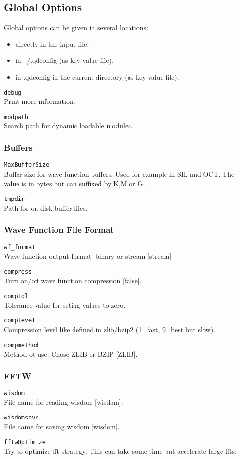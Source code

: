 \documentclass[a4paper,12pt]{scrbook}
\newcommand{\option}[2]{\item \texttt{#1}\\ #2}
\begin{document}
\subsection{Global Options}
Global options can be given in several locations:
\begin{itemize}
 \item directly in the input file.
 \item in ~/.qdconfig (as key-value file).
 \item in .qdconfig in the current directory (as key-value file).
\end{itemize}

\begin{options}
 \option{debug}{Print more information.}
 \option{modpath}{Search path for dynamic loadable modules.}
\end{options} 

\subsubsection{Buffers}
\begin{options}
 \option{MaxBufferSize}{Buffer size for wave function buffers. Used for example in SIL and OCT. The value is in bytes but
 can suffixed by K,M or G.}
 \option{tmpdir}{Path for on-disk buffer files.}
\end{options}

\subsubsection{Wave Function File Format}
\begin{options}
 \option{wf\_format}{Wave function output format: binary or stream  [stream]}
 \option{compress}{Turn on/off wave function compression [false].}
 \option{comptol}{Tolerance value for seting values to zero.}
 \option{complevel}{Compression level like defined in zlib/bzip2 (1=fast, 9=best but slow).}
 \option{compmethod}{Method ot use. Chose ZLIB or BZIP [ZLIB].}
\end{options}

\subsubsection{FFTW}
\begin{options}
 \option{wisdom}{File name for reading wisdom [wisdom].}
 \option{wisdomsave}{File name for saving wisdom [wisdom].}
 \option{fftwOptimize}{Try to optimize fft strategy. This can take some time but accelerate large ffts.}
\end{options}
\end{document}
